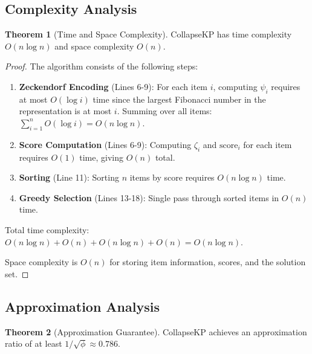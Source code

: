 \documentclass[11pt]{article}
\theoremstyle{remark}
\theoremstyle{definition}
\newtheorem{theorem}{Theorem}
\begin{document}
\subsection{Complexity Analysis}

\begin{theorem}[Time and Space Complexity]
CollapseKP has time complexity $O(n \log n)$ and space complexity $O(n)$.
\end{theorem}

\begin{proof}
The algorithm consists of the following steps:
\begin{enumerate}
\item \textbf{Zeckendorf Encoding} (Lines 6-9): For each item $i$, computing $\psi_i$ requires at most $O(\log i)$ time since the largest Fibonacci number in the representation is at most $i$. Summing over all items: $\sum_{i=1}^n O(\log i) = O(n \log n)$.

\item \textbf{Score Computation} (Lines 6-9): Computing $\zeta_i$ and $\text{score}_i$ for each item requires $O(1)$ time, giving $O(n)$ total.

\item \textbf{Sorting} (Line 11): Sorting $n$ items by score requires $O(n \log n)$ time.

\item \textbf{Greedy Selection} (Lines 13-18): Single pass through sorted items in $O(n)$ time.
\end{enumerate}

Total time complexity: $O(n \log n) + O(n) + O(n \log n) + O(n) = O(n \log n)$.

Space complexity is $O(n)$ for storing item information, scores, and the solution set.
\end{proof}

\subsection{Approximation Analysis}

\begin{theorem}[Approximation Guarantee]
CollapseKP achieves an approximation ratio of at least $1/\sqrt{\phi} \approx 0.786$.
\end{theorem}
\end{document}
